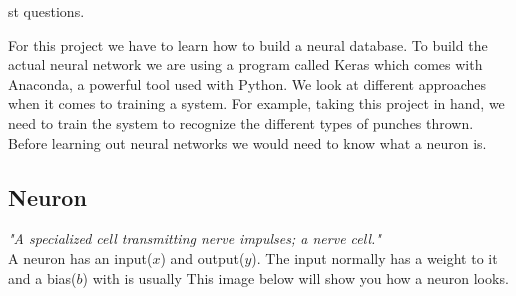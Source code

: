 \documentclass[a4paper,12pt]{report}
\begin{document}
st questions. \cite{bostrom2014ethics}

For this project we have to learn how to build a neural database. To build the actual neural network we are using a program called Keras which comes with Anaconda, a powerful tool used with Python. We look at different approaches when it comes to training a system. For example, taking this project in hand, we need to train the system to recognize the different types of punches thrown. Before learning out neural networks we would need to know what a neuron is.

\subsection{Neuron}
\textit{"A specialized cell transmitting nerve impulses; a nerve cell."} \\ A neuron has an input($x$) and output($y$). The input normally has a weight to it and a bias($b$) with is usually This image below will show you how a neuron looks.
\end{document}
